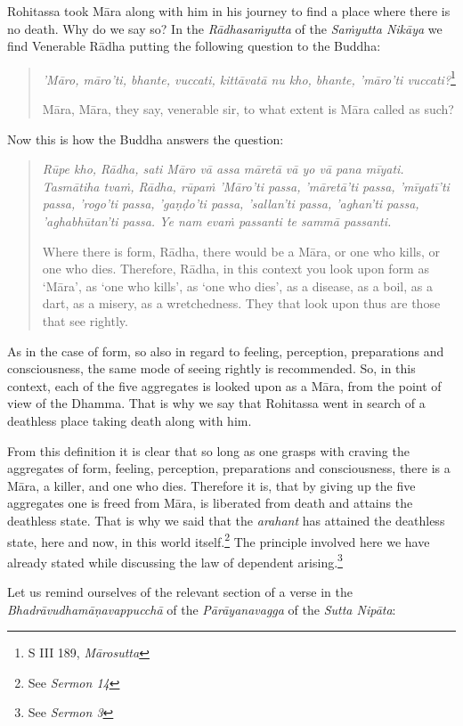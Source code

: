 Rohitassa took Māra along with him in his journey to find a place where there is no death. Why do we say so? In the \emph{Rādhasaṁyutta} of the \emph{Saṁyutta Nikāya} we find Venerable Rādha putting the following question to the Buddha:

\begin{quote}
\emph{'Māro, māro'ti, bhante, vuccati, kittāvatā nu kho, bhante, 'māro'ti vuccati?}\footnote{S III 189, \emph{Mārosutta}}

Māra, Māra, they say, venerable sir, to what extent is Māra called as such?
\end{quote}

Now this is how the Buddha answers the question:

\begin{quote}
\emph{Rūpe kho, Rādha, sati Māro vā assa māretā vā yo vā pana mīyati. Tasmātiha tvaṁ, Rādha, rūpaṁ 'Māro'ti passa, 'māretā'ti passa, 'mīyatī'ti passa, 'rogo'ti passa, 'gaṇḍo'ti passa, 'sallan'ti passa, 'aghan'ti passa, 'aghabhūtan'ti passa. Ye nam evaṁ passanti te sammā passanti.}

Where there is form, Rādha, there would be a Māra, or one who kills, or one who dies. Therefore, Rādha, in this context you look upon form as `Māra', as `one who kills', as `one who dies', as a disease, as a boil, as a dart, as a misery, as a wretchedness. They that look upon thus are those that see rightly.
\end{quote}

As in the case of form, so also in regard to feeling, perception, preparations and consciousness, the same mode of seeing rightly is recommended. So, in this context, each of the five aggregates is looked upon as a Māra, from the point of view of the Dhamma. That is why we say that Rohitassa went in search of a deathless place taking death along with him.

From this definition it is clear that so long as one grasps with craving the aggregates of form, feeling, perception, preparations and consciousness, there is a Māra, a killer, and one who dies. Therefore it is, that by giving up the five aggregates one is freed from Māra, is liberated from death and attains the deathless state. That is why we said that the \emph{arahant} has attained the deathless state, here and now, in this world itself.\footnote{See \emph{Sermon 14}} The principle involved here we have already stated while discussing the law of dependent arising.\footnote{See \emph{Sermon 3}}

Let us remind ourselves of the relevant section of a verse in the \emph{Bhadrāvudhamāṇavappucchā} of the \emph{Pārāyanavagga} of the \emph{Sutta Nipāta}:

